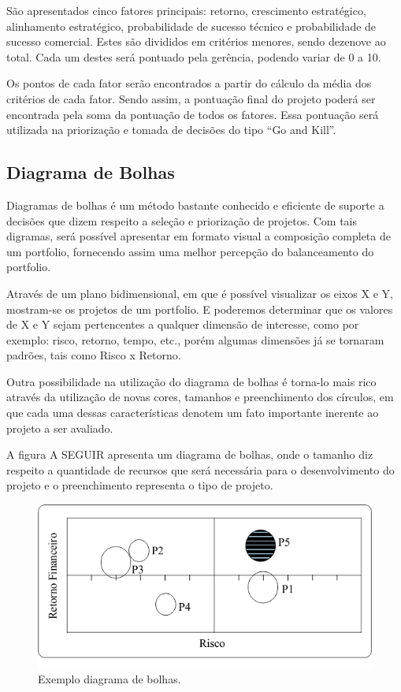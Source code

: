 \documentclass[12pt,a4paper,ruledheader,tocpage=prefix,floatnumber=continuous,pagestart=folhaderosto,font=times]{abnt}
\begin{document}
São apresentados cinco fatores principais: retorno, crescimento estratégico, alinhamento estratégico, probabilidade de sucesso técnico e probabilidade de
sucesso comercial. Estes são divididos em critérios menores, sendo dezenove ao total. Cada um destes será pontuado pela gerência, podendo variar de 0 a 10.

Os pontos de cada fator serão encontrados a partir do cálculo da média dos critérios de cada fator. Sendo assim, a pontuação final do projeto poderá ser 
encontrada pela soma da pontuação de todos os fatores. Essa pontuação será utilizada na priorização e tomada de decisões do tipo ``Go and Kill''.

\subsection{Diagrama de Bolhas}
Diagramas de bolhas é um método bastante conhecido e eficiente de suporte a decisões que dizem respeito a seleção e priorização de projetos. Com tais
digramas, será possível apresentar em formato visual a composição completa de um portfolio, fornecendo assim uma melhor percepção do balanceamento do
portfolio. \cite{COOPER2001b}

Através de um plano bidimensional, em que é possível visualizar os eixos X e Y, mostram-se os projetos de um portfolio. E poderemos determinar que os 
valores de X e Y sejam pertencentes a qualquer dimensão de interesse, como por exemplo: risco, retorno, tempo, etc., porém algumas dimensões já se 
tornaram padrões, tais como Risco x Retorno.\cite{COOPER2001}

Outra possibilidade na utilização do diagrama de bolhas é torna-lo mais rico através da utilização de novas cores, tamanhos e preenchimento dos círculos, 
em que cada uma dessas características denotem um fato importante inerente ao projeto a ser avaliado.

A figura A SEGUIR apresenta um diagrama de bolhas, onde o tamanho diz respeito a quantidade de recursos que será necessária para o desenvolvimento do projeto
e o preenchimento representa o tipo de projeto.

\begin{figure}[H]
\centering
\includegraphics[width=.7\textwidth]{img/fig6.png}
\caption{Exemplo diagrama de bolhas\cite{COOPER2001}.}
\end{figure} 
\end{document}
